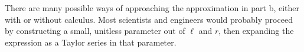 There are many possible ways of approaching the approximation
in part b,
either with or without calculus. Most scientists and engineers
would probably proceed by constructing a small, unitless
parameter out of $\ell$ and $r$, then expanding the expression
as a Taylor series in that parameter.
